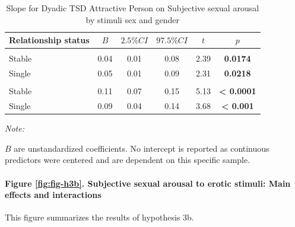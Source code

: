 \documentclass[
  bookmarksnumbered]{article}
\begin{document}
\begin{table}[H]
\centering
\caption{\label{tab:unnamed-chunk-30}Slope for Dyadic TSD Attractive Person on
        Subjective sexual arousal by stimuli sex and gender}
\centering
\begin{threeparttable}
\begin{tabular}[t]{lccccc}
\toprule
Relationship status & $B$ & $2.5\% CI$ & $97.5\% CI$ & $t$ & $p$\\
\midrule
\addlinespace[0.3em]
\multicolumn{6}{l}{\cellcolor{lightgray}{Gender: Women}}\\
\hspace{1em}Stable & 0.04 & 0.01 & 0.08 & 2.39 & \textbf{0.0174}\\
\hspace{1em}Single & 0.05 & 0.01 & 0.09 & 2.31 & \textbf{0.0218}\\
\addlinespace[0.3em]
\multicolumn{6}{l}{\cellcolor{lightgray}{Gender: Men}}\\
\hspace{1em}Stable & 0.11 & 0.07 & 0.15 & 5.13 & \textbf{< 0.0001}\\
\hspace{1em}Single & 0.09 & 0.04 & 0.14 & 3.68 & \textbf{< 0.001}\\
\bottomrule
\end{tabular}
\begin{tablenotes}[para]
\item \textit{Note: } 
\item $B$ are unstandardized coefficients.
           No intercept is reported as continuous predictors were centered
           and are dependent on this specific sample.
\end{tablenotes}
\end{threeparttable}
\end{table}

\paragraph{Figure \ref{fig:fig-h3b}. Subjective sexual arousal to erotic stimuli: Main effects and interactions}\label{figure-reffigfig-h3b.-subjective-sexual-arousal-to-erotic-stimuli-main-effects-and-interactions}

This figure summarizes the results of hypothesis 3b.
\end{document}
